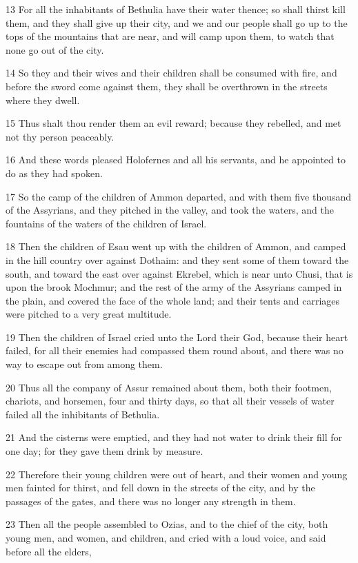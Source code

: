 \par 13 For all the inhabitants of Bethulia have their water thence; so shall thirst kill them, and they shall give up their city, and we and our people shall go up to the tops of the mountains that are near, and will camp upon them, to watch that none go out of the city.
\par 14 So they and their wives and their children shall be consumed with fire, and before the sword come against them, they shall be overthrown in the streets where they dwell.
\par 15 Thus shalt thou render them an evil reward; because they rebelled, and met not thy person peaceably.
\par 16 And these words pleased Holofernes and all his servants, and he appointed to do as they had spoken.
\par 17 So the camp of the children of Ammon departed, and with them five thousand of the Assyrians, and they pitched in the valley, and took the waters, and the fountains of the waters of the children of Israel.
\par 18 Then the children of Esau went up with the children of Ammon, and camped in the hill country over against Dothaim: and they sent some of them toward the south, and toward the east over against Ekrebel, which is near unto Chusi, that is upon the brook Mochmur; and the rest of the army of the Assyrians camped in the plain, and covered the face of the whole land; and their tents and carriages were pitched to a very great multitude.
\par 19 Then the children of Israel cried unto the Lord their God, because their heart failed, for all their enemies had compassed them round about, and there was no way to escape out from among them.
\par 20 Thus all the company of Assur remained about them, both their footmen, chariots, and horsemen, four and thirty days, so that all their vessels of water failed all the inhibitants of Bethulia.
\par 21 And the cisterns were emptied, and they had not water to drink their fill for one day; for they gave them drink by measure.
\par 22 Therefore their young children were out of heart, and their women and young men fainted for thirst, and fell down in the streets of the city, and by the passages of the gates, and there was no longer any strength in them.
\par 23 Then all the people assembled to Ozias, and to the chief of the city, both young men, and women, and children, and cried with a loud voice, and said before all the elders,
